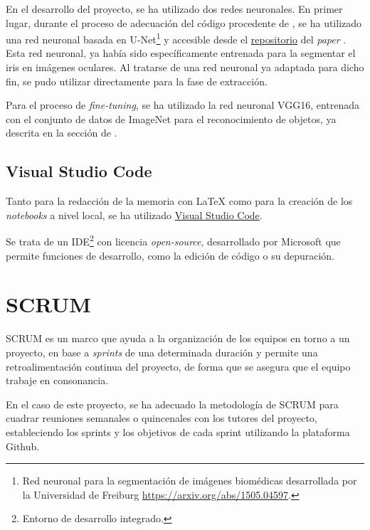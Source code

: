 En el desarrollo del proyecto, se ha utilizado dos redes neuronales. En primer lugar, durante el proceso de adecuación del código procedente de \cite{tfg_iris_2020}, se ha utilizado una red neuronal basada en U-Net\footnote{Red neuronal para la segmentación de imágenes biomédicas desarrollada por la Universidad de Freiburg \url{https://arxiv.org/abs/1505.04597}.} y accesible desde el \href{https://github.com/jus390/U-net-Iris-segmentation}{repositorio} del \textit{paper} \cite{lozej_end--end_2018}. Esta red neuronal, ya había sido
específicamente entrenada para la segmentar el iris en imágenes oculares. Al tratarse de una red neuronal ya adaptada para dicho fin, se pudo utilizar directamente para la fase de extracción.

Para el proceso de \textit{fine-tuning}, se ha utilizado la red neuronal VGG16, entrenada con el conjunto de datos de ImageNet para el reconocimiento de objetos, ya descrita en la sección de .

\subsection{Visual Studio Code}

Tanto para la redacción de la memoria con LaTeX como para la creación de los \textit{notebooks} a nivel local, se ha utilizado \href{https://code.visualstudio.com/}{Visual Studio Code}.

Se trata de un IDE\footnote{Entorno de desarrollo integrado.} con licencia \textit{open-source}, desarrollado por Microsoft que permite funciones de desarrollo, como la edición de código o su depuración.

\section{SCRUM}
SCRUM es un marco que ayuda a la organización de los equipos en torno a un proyecto, en base a \textit{sprints} de una determinada duración y permite una retroalimentación
continua del proyecto, de forma que se asegura que el equipo trabaje en consonancia.

En el caso de este proyecto, se ha adecuado la metodología de SCRUM para cuadrar reuniones semanales o quincenales con los tutores del proyecto, estableciendo
los sprints y los objetivos de cada sprint utilizando la plataforma Github.





